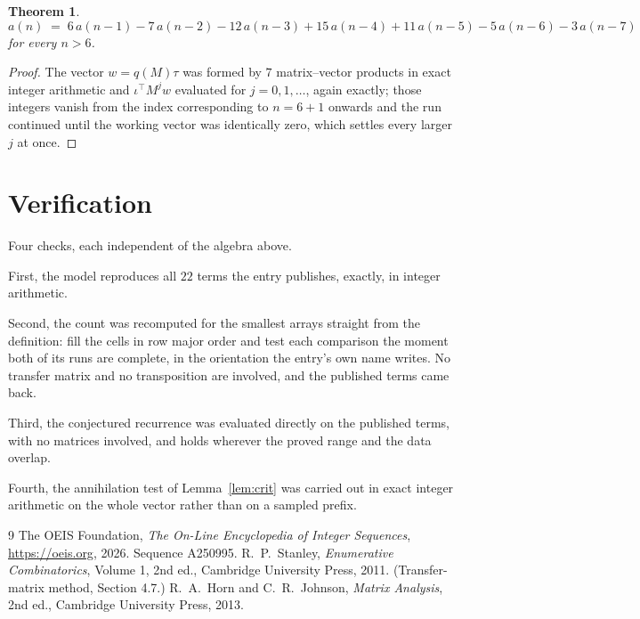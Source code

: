 \documentclass[11pt,a4paper]{article}
\theoremstyle{plain}
\newtheorem{theorem}{Theorem}
\theoremstyle{definition}
\begin{document}
\begin{theorem}
\[
a(n)\;=\;6\,a(n-1) - 7\,a(n-2) - 12\,a(n-3) + 15\,a(n-4) + 11\,a(n-5) - 5\,a(n-6) - 3\,a(n-7)
\]
for every $n>6$.
\end{theorem}

\begin{proof}
The vector $w=q(M)\tau$ was formed by $7$ matrix--vector products in exact integer
arithmetic and $\iota^{\!\top}M^{j}w$ evaluated for $j=0,1,\dots$, again exactly; those
integers vanish from the index corresponding to $n=6+1$ onwards and the run continued
until the working vector was identically zero, which settles every larger $j$ at once.
\end{proof}

\section{Verification}

Four checks, each independent of the algebra above.

First, the model reproduces all $22$ terms the entry publishes, exactly, in integer
arithmetic.

Second, the count was recomputed for the smallest arrays straight from the definition: fill the
cells in row major order and test each comparison the moment both of its runs are complete,
in the orientation the entry's own name writes. No transfer matrix and no transposition are
involved, and the published terms came back.

Third, the conjectured recurrence was evaluated directly on the published terms, with no
matrices involved, and holds wherever the proved range and the data overlap.

Fourth, the annihilation test of Lemma~\ref{lem:crit} was carried out in exact integer
arithmetic on the whole vector rather than on a sampled prefix.

\begin{thebibliography}{9}
 The OEIS Foundation, \emph{The On-Line Encyclopedia of Integer
Sequences}, \url{https://oeis.org}, 2026. Sequence A250995.
 R.~P.~Stanley, \emph{Enumerative Combinatorics}, Volume 1, 2nd ed.,
Cambridge University Press, 2011. (Transfer-matrix method, Section 4.7.)
 R.~A.~Horn and C.~R.~Johnson, \emph{Matrix Analysis}, 2nd ed., Cambridge
University Press, 2013.
\end{thebibliography}
\end{document}
